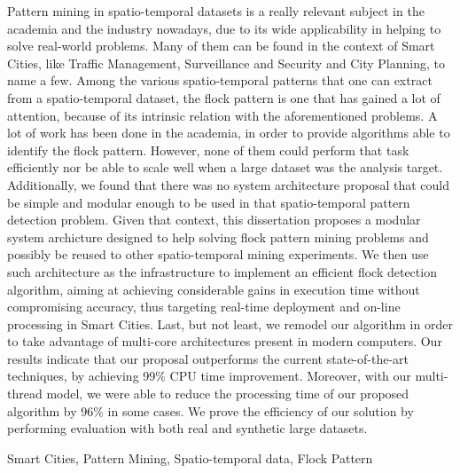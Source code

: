 Pattern mining in spatio-temporal datasets is a really relevant subject in the academia and the industry nowadays, due
to its wide applicability in helping to solve real-world problems. Many of them can be found in the context of Smart
Cities, like Traffic Management, Surveillance and Security and City Planning, to name a few. Among the various
spatio-temporal patterns that one can extract from a spatio-temporal dataset, the flock pattern is one that has gained a
lot of attention, because of its intrinsic relation with the aforementioned problems. A lot of work has been done in the
academia, in order to provide algorithms able to identify the flock pattern. However, none of them could perform that
task efficiently nor be able to scale well when a large dataset was the analysis target. Additionally, we found that
there was no system architecture proposal that could be simple and modular enough to be used in that spatio-temporal
pattern detection problem. Given that context, this dissertation proposes a modular system archicture designed to help
solving flock pattern mining problems and possibly be reused to other spatio-temporal mining experiments. We then use
such architecture as the infrastructure to implement an efficient flock detection algorithm, aiming at achieving
considerable gains in execution time without compromising accuracy, thus targeting real-time deployment and on-line
processing in Smart Cities. Last, but not least, we remodel our algorithm in order to take advantage of multi-core
architectures present in modern computers. Our results indicate that our proposal outperforms the current
state-of-the-art techniques, by achieving 99\% CPU time improvement. Moreover, with our multi-thread model, we were able
to reduce the processing time of our proposed algorithm by 96\% in some cases. We prove the efficiency of our solution
by performing evaluation with both real and synthetic large datasets.

\begin{keywords}
Smart Cities, Pattern Mining, Spatio-temporal data, Flock Pattern
\end{keywords}
